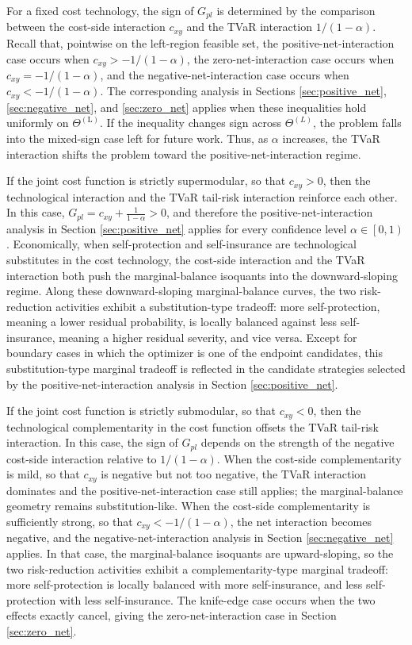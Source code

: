\documentclass[a4paper,12pt]{article}
\begin{document}
For a fixed cost technology, the sign of $G_{pl}$ is determined by the comparison between the cost-side interaction $c_{xy}$ and the TVaR interaction $1/\left(1-\alpha\right)$. Recall that, pointwise on the left-region feasible set, the positive-net-interaction case occurs when $c_{xy}>-1/\left(1-\alpha\right)$, the zero-net-interaction case occurs when $c_{xy}=-1/\left(1-\alpha\right)$, and the negative-net-interaction case occurs when $c_{xy}<-1/\left(1-\alpha\right)$. The corresponding analysis in Sections \ref{sec:positive_net}, \ref{sec:negative_net}, and \ref{sec:zero_net} applies when these inequalities hold uniformly on $\Theta^{\left(\text{L}\right)}$. If the inequality changes sign across \(\Theta^{(L)}\), the problem falls into the mixed-sign case left for future work. Thus, as $\alpha$ increases, the TVaR interaction shifts the problem toward the positive-net-interaction regime.

If the joint cost function is strictly supermodular, so that $c_{xy}>0$, then the technological interaction and the TVaR tail-risk interaction reinforce each other. In this case, $G_{pl}=c_{xy}+\frac{1}{1-\alpha}>0$, and therefore the positive-net-interaction analysis in Section \ref{sec:positive_net} applies for every confidence level $\alpha\in\left[0,1\right)$. Economically, when self-protection and self-insurance are technological substitutes in the cost technology, the cost-side interaction and the TVaR interaction both push the marginal-balance isoquants into the downward-sloping regime. Along these downward-sloping marginal-balance curves, the two risk-reduction activities exhibit a substitution-type tradeoff: more self-protection, meaning a lower residual probability, is locally balanced against less self-insurance, meaning a higher residual severity, and vice versa. Except for boundary cases in which the optimizer is one of the endpoint candidates, this substitution-type marginal tradeoff is reflected in the candidate strategies selected by the positive-net-interaction analysis in Section \ref{sec:positive_net}.

If the joint cost function is strictly submodular, so that $c_{xy}<0$, then the technological complementarity in the cost function offsets the TVaR tail-risk interaction. In this case, the sign of $G_{pl}$ depends on the strength of the negative cost-side interaction relative to $1/\left(1-\alpha\right)$. When the cost-side complementarity is mild, so that $c_{xy}$ is negative but not too negative, the TVaR interaction dominates and the positive-net-interaction case still applies; the marginal-balance geometry remains substitution-like. When the cost-side complementarity is sufficiently strong, so that $c_{xy}<-1/\left(1-\alpha\right)$, the net interaction becomes negative, and the negative-net-interaction analysis in Section \ref{sec:negative_net} applies. In that case, the marginal-balance isoquants are upward-sloping, so the two risk-reduction activities exhibit a complementarity-type marginal tradeoff: more self-protection is locally balanced with more self-insurance, and less self-protection with less self-insurance. The knife-edge case occurs when the two effects exactly cancel, giving the zero-net-interaction case in Section \ref{sec:zero_net}.
\end{document}
